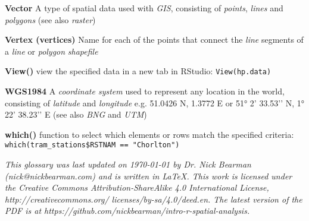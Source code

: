 \documentclass[a4paper,10pt]{article}
\begin{document}
\begin{multicols}{2}
\textbf{Vector} A type of spatial data used with \textit{GIS}, consisting of \textit{points}, \textit{lines} and \textit{polygons} (see also \textit{raster})

\textbf{Vertex (vertices)} Name for each of the points that connect the \textit{line} segments of a \textit{line} or \textit{polygon} \textit{shapefile}

\textbf{View()} view the specified data in a new tab in RStudio: \texttt{View(hp.data)}

\textbf{WGS1984} A \textit{coordinate system} used to represent any location in the world, consisting of \textit{latitude} and \textit{longitude} e.g. 51.0426 N, 1.3772 E or \ang{51} 2’ 33.53’’ N, \ang{1} 22’ 38.23’’ E (see also \textit{BNG} and \textit{UTM}) 

\textbf{which()} function to select which elements or rows match the specified criteria: \texttt{which(tram\_stations\$RSTNAM == "Chorlton")}

\end{multicols}

\begin{center}

{\footnotesize \textit{This glossary was last updated on {\today} by Dr. Nick Bearman (nick@nickbearman.com) and is written in LaTeX. This work is licensed under the Creative Commons Attribution-ShareAlike 4.0 International License, http://creativecommons.org/ licenses/by-sa/4.0/deed.en. The latest version of the PDF is at https://github.com/nickbearman/intro-r-spatial-analysis.}}

\end{center}
\end{document}
